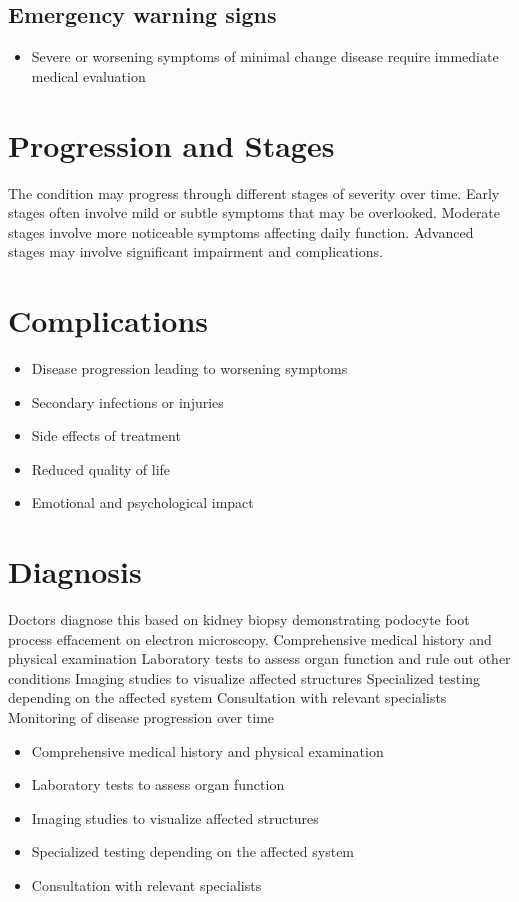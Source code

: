 \subsection{Emergency warning signs}
\begin{itemize}[noitemsep]
  \item Severe or worsening symptoms of minimal change disease require immediate medical evaluation
\end{itemize}
\section{Progression and Stages}
The condition may progress through different stages of severity over time. Early stages often involve mild or subtle symptoms that may be overlooked. Moderate stages involve more noticeable symptoms affecting daily function. Advanced stages may involve significant impairment and complications.
\section{Complications}
\begin{itemize}[noitemsep]
  \item Disease progression leading to worsening symptoms
  \item Secondary infections or injuries
  \item Side effects of treatment
  \item Reduced quality of life
  \item Emotional and psychological impact
\end{itemize}
\section{Diagnosis}
Doctors diagnose this based on kidney biopsy demonstrating podocyte foot process effacement on electron microscopy. Comprehensive medical history and physical examination Laboratory tests to assess organ function and rule out other conditions Imaging studies to visualize affected structures Specialized testing depending on the affected system Consultation with relevant specialists Monitoring of disease progression over time

\begin{itemize}[noitemsep]
  \item Comprehensive medical history and physical examination
  \item Laboratory tests to assess organ function
  \item Imaging studies to visualize affected structures
  \item Specialized testing depending on the affected system
  \item Consultation with relevant specialists
\end{itemize}

